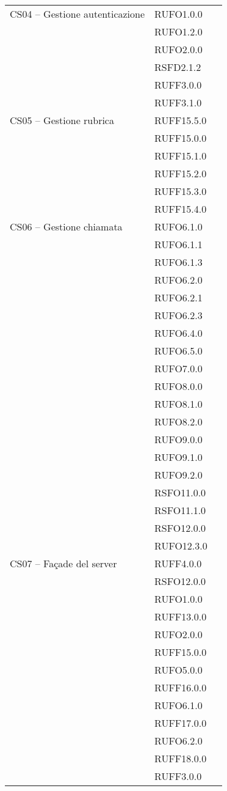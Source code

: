 \begin{center}
\begin{longtable}{lp{}l}
CS04 -- Gestione autenticazione & RUFO1.0.0 \\
 & RUFO1.2.0 \\
 & RUFO2.0.0 \\
 & RSFD2.1.2 \\
 & RUFF3.0.0 \\
 & RUFF3.1.0 \\
 
CS05 -- Gestione rubrica & RUFF15.5.0 \\
 & RUFF15.0.0 \\
 & RUFF15.1.0 \\
 & RUFF15.2.0 \\
 & RUFF15.3.0 \\
 & RUFF15.4.0 \\
 
CS06 -- Gestione chiamata
 & RUFO6.1.0 \\
 & RUFO6.1.1 \\
 & RUFO6.1.3 \\
 & RUFO6.2.0 \\
 & RUFO6.2.1 \\
 & RUFO6.2.3 \\
 & RUFO6.4.0 \\
 & RUFO6.5.0 \\
 & RUFO7.0.0 \\
 & RUFO8.0.0 \\
 & RUFO8.1.0 \\
 & RUFO8.2.0 \\
 & RUFO9.0.0 \\
 & RUFO9.1.0 \\
 & RUFO9.2.0 \\
 & RSFO11.0.0 \\
 & RSFO11.1.0 \\
 & RSFO12.0.0 \\
 & RUFO12.3.0 \\
 
CS07 -- Façade del server & RUFF4.0.0 \\
 & RSFO12.0.0 \\
 & RUFO1.0.0 \\
 & RUFF13.0.0 \\
 & RUFO2.0.0 \\
 & RUFF15.0.0 \\
 & RUFO5.0.0 \\
 & RUFF16.0.0 \\
 & RUFO6.1.0 \\
 & RUFF17.0.0 \\
 & RUFO6.2.0 \\
 & RUFF18.0.0 \\
 & RUFF3.0.0 \\
 

\end{longtable}
\end{center}

